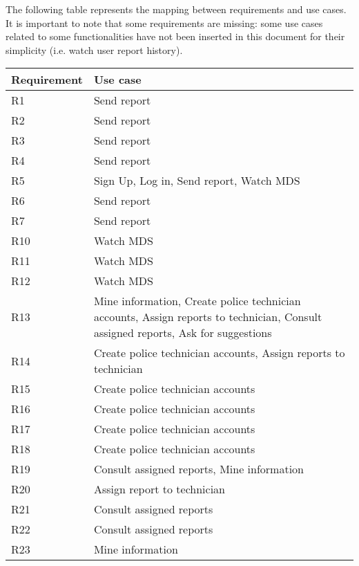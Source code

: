 The following table represents the mapping between requirements and use cases. It is important to note that some requirements are missing: some use cases related to some functionalities have not been inserted in this document for their simplicity (i.e. watch user report history).

\begin{table}[H]
  \centering
  \renewcommand{\arraystretch}{0.9}
  \begin{tabularx}{\textwidth}{ |l|X| }
      \hline
      \textbf{Requirement} & \textbf{Use case} \\
      \hline
      R1 & Send report \\
      \hline
      R2 & Send report \\
      \hline
      R3 & Send report \\
      \hline
      R4 & Send report \\
      \hline
      R5 & Sign Up, Log in, Send report, Watch MDS \\
      \hline      							
      R6 & Send report \\
      \hline
      R7 & Send report \\
      \hline
      R10 & Watch MDS \\
      \hline
      R11 & Watch MDS \\
      \hline
      R12 & Watch MDS \\
      \hline
      R13 & Mine information, Create police technician accounts, Assign reports to technician, Consult assigned reports, Ask for suggestions \\
      \hline 
      R14 & Create police technician accounts, Assign reports to technician \\
      \hline
      R15 & Create police technician accounts \\
      \hline
      R16 & Create police technician accounts \\
      \hline
      R17 & Create police technician accounts \\
      \hline
      R18 & Create police technician accounts \\
      \hline
      R19 & Consult assigned reports, Mine information \\
      \hline
      R20 & Assign report to technician \\
      \hline
      R21 & Consult assigned reports \\
      \hline
      R22 & Consult assigned reports \\
      \hline
      R23 & Mine information \\

\end{tabularx}
\end{table}
